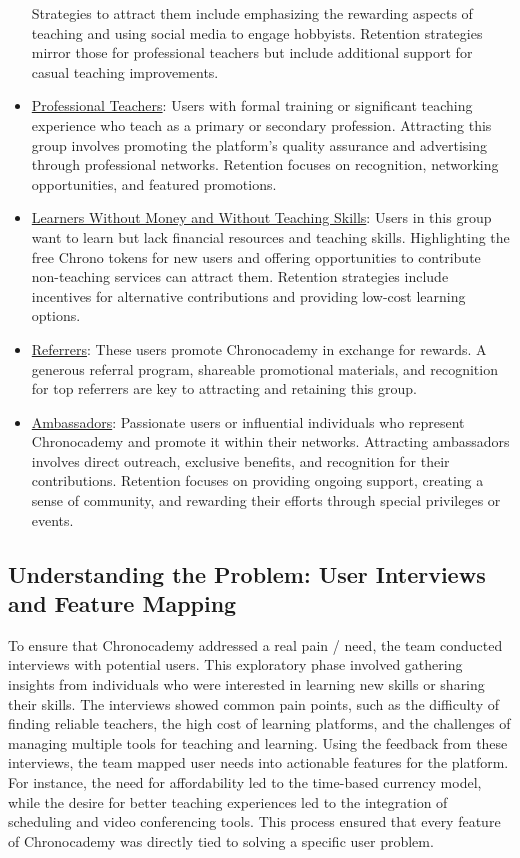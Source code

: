 \begin{itemize}
    Strategies to attract them include emphasizing the rewarding aspects of teaching and using social media to engage hobbyists.
    Retention strategies mirror those for professional teachers but include additional support for casual teaching improvements.
    \item \underline{Professional Teachers}: Users with formal training or significant teaching experience who teach as a primary or secondary profession.
    Attracting this group involves promoting the platform’s quality assurance and advertising through professional networks.
    Retention focuses on recognition, networking opportunities, and featured promotions.
    \item \underline{Learners Without Money and Without Teaching Skills}: Users in this group want to learn but lack financial resources and teaching skills.
    Highlighting the free Chrono tokens for new users and offering opportunities to contribute non-teaching services can attract them.
    Retention strategies include incentives for alternative contributions and providing low-cost learning options.
    \item \underline{Referrers}: These users promote Chronocademy in exchange for rewards.
    A generous referral program, shareable promotional materials, and recognition for top referrers are key to attracting and retaining this group.
    \item \underline{Ambassadors}: Passionate users or influential individuals who represent Chronocademy and promote it within their networks.
    Attracting ambassadors involves direct outreach, exclusive benefits, and recognition for their contributions.
    Retention focuses on providing ongoing support, creating a sense of community, and rewarding their efforts through special privileges or events.
\end{itemize}

\subsection{Understanding the Problem: User Interviews and Feature Mapping}\label{subsec:user-interviews-feature-mapping}
To ensure that Chronocademy addressed a real pain / need, the team conducted interviews with potential users.
This exploratory phase involved gathering insights from individuals who were interested in learning new skills or sharing their skills.
The interviews showed common pain points, such as the difficulty of finding reliable teachers, the high cost of learning platforms, and the challenges of managing multiple tools for teaching and learning.
Using the feedback from these interviews, the team mapped user needs into actionable features for the platform.
For instance, the need for affordability led to the time-based currency model, while the desire for better teaching experiences led to the integration of scheduling and video conferencing tools.
This process ensured that every feature of Chronocademy was directly tied to solving a specific user problem.

